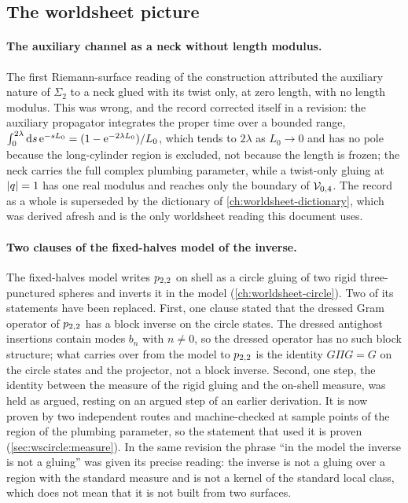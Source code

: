 \subsection{The worldsheet picture}

\paragraph{The auxiliary channel as a neck without length modulus.}
The first Riemann-surface reading of the construction attributed the auxiliary nature of $\Sigma_2$ to a neck glued with its twist only, at zero length, with no length modulus.
This was wrong, and the record corrected itself in a revision: the auxiliary propagator integrates the proper time over a bounded range, $\int_0^{2 \lambda} \mathrm{d} s \, \mathrm{e}^{- s L_0} = (1 - \mathrm{e}^{- 2 \lambda L_0}) / L_0$, which tends to $2 \lambda$ as $L_0 \to 0$ and has no pole because the long-cylinder region is excluded, not because the length is frozen; the neck carries the full complex plumbing parameter, while a twist-only gluing at ${|q|} = 1$ has one real modulus and reaches only the boundary of ${\mathcal{V}}_{0, 4}$.
The record as a whole is superseded by the dictionary of \cref{ch:worldsheet-dictionary}, which was derived afresh and is the only worldsheet reading this document uses.

\paragraph{Two clauses of the fixed-halves model of the inverse.}
The fixed-halves model writes $p_{2,2}$ on shell as a circle gluing of two rigid three-punctured spheres and inverts it in the model (\cref{ch:worldsheet-circle}).
Two of its statements have been replaced.
First, one clause stated that the dressed Gram operator of $p_{2,2}$ has a block inverse on the circle states.
The dressed antighost insertions contain modes $b_n$ with $n \neq 0$, so the dressed operator has no such block structure; what carries over from the model to $p_{2,2}$ is the identity $G \Pi G = G$ on the circle states and the projector, not a block inverse.
Second, one step, the identity between the measure of the rigid gluing and the on-shell measure, was held as argued, resting on an argued step of an earlier derivation.
It is now proven by two independent routes and machine-checked at sample points of the region of the plumbing parameter, so the statement that used it is proven (\cref{sec:wscircle:measure}).
In the same revision the phrase \enquote{in the model the inverse is not a gluing} was given its precise reading: the inverse is not a gluing over a region with the standard measure and is not a kernel of the standard local class, which does not mean that it is not built from two surfaces.


